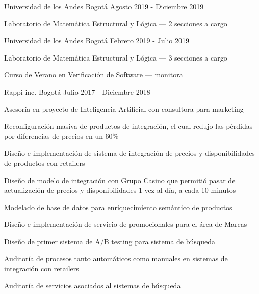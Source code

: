 


\begin{cventries}
  {Universidad de los Andes}
  {Bogotá}
  {Agosto 2019 - Diciembre 2019}
  {
    \begin{cvitems}
    \item{Laboratorio de Matemática Estructural y Lógica --- 2 secciones a cargo}
    \end{cvitems}
  }

  {Universidad de los Andes}
  {Bogotá}
  {Febrero 2019 - Julio 2019}
  {
    \begin{cvitems}
    \item{Laboratorio de Matemática Estructural y Lógica --- 3 secciones a cargo}
    \item{Curso de Verano en Verificación de Software --- monitora }
    \end{cvitems}
  }

  {Rappi inc.} %
  {Bogotá} %
  {Julio 2017 - Diciembre 2018} %
  {
    \begin{cvitems}
    \item{Asesoría en proyecto de Inteligencia Artificial con consultora para marketing}
    \item{Reconfiguración masiva de productos de integración, el cual redujo las pérdidas por diferencias de precios en un 60\%}
    \item{Diseño e implementación de sistema de integración de precios y disponibilidades de productos con retailers}
    \item{Diseño de modelo de integración con Grupo Casino que permitió pasar de actualización de precios y disponibilidades 1 vez al día, a cada 10 minutos}
    \item{Modelado de base de datos para enriquecimiento semántico de productos}
    \item{Diseño e implementación de servicio de promocionales para el área de Marcas}
    \item{Diseño de primer sistema de A/B testing para sistema de búsqueda}
    \item{Auditoría de procesos tanto automáticos como manuales en sistemas de integración con retailers}
    \item{Auditoría de servicios asociados al sistemas de búsqueda}
   \end{cvitems}
  } %



\end{cventries}
